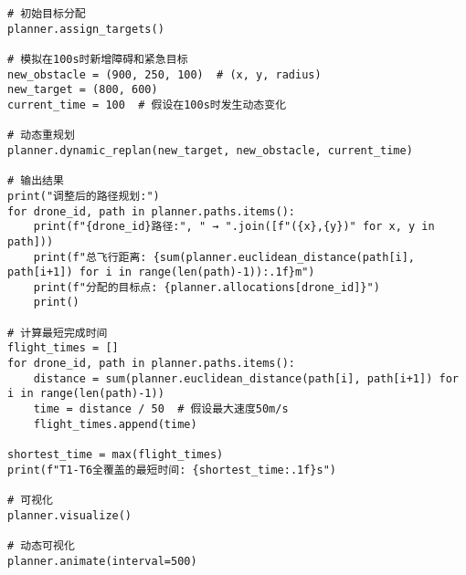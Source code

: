 \documentclass[12pt,fontset=adobe]{ctexart}
\begin{document}
\begin{verbatim}
# 初始目标分配
planner.assign_targets()

# 模拟在100s时新增障碍和紧急目标
new_obstacle = (900, 250, 100)  # (x, y, radius)
new_target = (800, 600)
current_time = 100  # 假设在100s时发生动态变化

# 动态重规划
planner.dynamic_replan(new_target, new_obstacle, current_time)

# 输出结果
print("调整后的路径规划:")
for drone_id, path in planner.paths.items():
    print(f"{drone_id}路径:", " → ".join([f"({x},{y})" for x, y in path]))
    print(f"总飞行距离: {sum(planner.euclidean_distance(path[i], path[i+1]) for i in range(len(path)-1)):.1f}m")
    print(f"分配的目标点: {planner.allocations[drone_id]}")
    print()

# 计算最短完成时间
flight_times = []
for drone_id, path in planner.paths.items():
    distance = sum(planner.euclidean_distance(path[i], path[i+1]) for i in range(len(path)-1))
    time = distance / 50  # 假设最大速度50m/s
    flight_times.append(time)

shortest_time = max(flight_times)
print(f"T1-T6全覆盖的最短时间: {shortest_time:.1f}s")

# 可视化
planner.visualize()

# 动态可视化
planner.animate(interval=500)
\end{verbatim}
\end{document}
